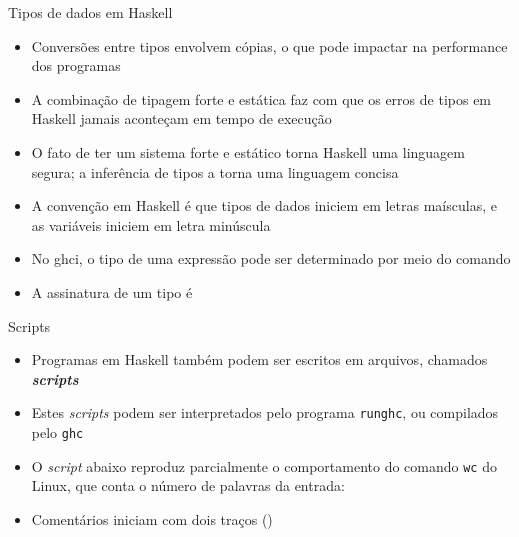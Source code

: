 \begin{frame}[fragile]{Tipos de dados em Haskell}

    \begin{itemize}
        \item Conversões entre tipos envolvem cópias, o que pode impactar na performance dos
            programas

        \item A combinação de tipagem forte e estática faz com que os erros de tipos em Haskell
            jamais aconteçam em tempo de execução

        \item O fato de ter um sistema forte e estático torna Haskell uma linguagem segura; a 
            inferência de tipos a torna uma linguagem concisa

        \item A convenção em Haskell é que tipos de dados iniciem em letras maísculas, e
            as variáveis iniciem em letra minúscula

        \item No ghci, o tipo de uma expressão pode ser determinado por meio do comando

        \item A assinatura de um tipo é 

    \end{itemize}

\end{frame}

\begin{frame}[fragile]{Scripts}

    \begin{itemize}
        \item Programas em Haskell também podem ser escritos em arquivos, chamados 
            \textit{\textbf{scripts}}

        \item Estes \textit{scripts} podem ser interpretados pelo programa \texttt{runghc}, ou
            compilados pelo \texttt{ghc}

        \item O \textit{script} abaixo reproduz parcialmente o comportamento do comando 
            \texttt{wc} do Linux, que conta o número de palavras da entrada:


        \item Comentários iniciam com dois traços ()
    \end{itemize}

\end{frame}
